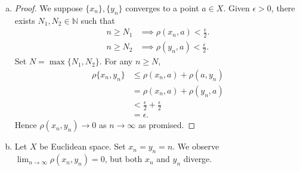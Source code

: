 \begin{Exercise}
\begin{enumerate}[a)]
\item 
\begin{proof}
We suppose $\{x_n\}, \{y_n\}$ converges to a point $a\in X$. Given $\epsilon>0$, there exists $N_1,N_2\in\mathbb{N}$ such that
\begin{align*}
n\geq N_1 &\implies \rho(x_n,a)<\frac{\epsilon}{2}. \\
n\geq N_2 &\implies \rho(y_n,a)<\frac{\epsilon}{2}.
\end{align*}
Set $N = \max\{N_1,N_2\}$. For any $n\geq N$,
\begin{align*}
\rho\{x_n,y_n\}
&\leq \rho(x_n,a) + \rho(a,y_n) \\
&= \rho(x_n,a) + \rho(y_n, a) \\
&< \frac{\epsilon}{2} + \frac{\epsilon}{2} \\
&= \epsilon.
\end{align*}
Hence $\rho(x_n,y_n)\to 0$ as $n\to\infty$ as promised.
\end{proof}

\item
\begin{solution}
Let $X$ be Euclidean space. Set $x_n = y_n = n$. We observe $\lim_{n\to\infty}\rho(x_n,y_n) = 0$, but both $x_n$ and $y_n$ diverge.
\end{solution}
\end{enumerate}
\end{Exercise}